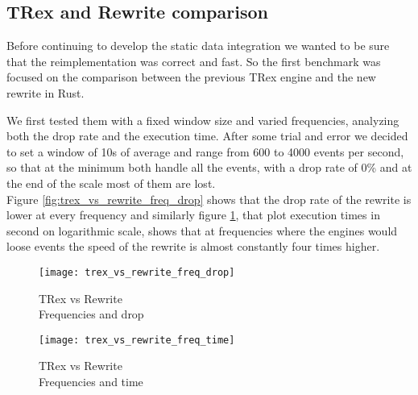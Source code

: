 \subsection{TRex and Rewrite comparison}
Before continuing to develop the static data integration we wanted to be sure that the reimplementation was correct and fast. So the first benchmark was focused on the comparison between the previous TRex engine and the new rewrite in Rust.

We first tested them with a fixed window size and varied frequencies, analyzing both the drop rate and the execution time. After some trial and error we decided to set a window of 10s of average and range from 600 to 4000 events per second, so that at the minimum both handle all the events, with a drop rate of 0\% and at the end of the scale most of them are lost.\\
Figure \ref{fig:trex_vs_rewrite_freq_drop} shows that the drop rate of the rewrite is lower at every frequency and similarly figure \ref{fig:trex_vs_rewrite_freq_time}, that plot execution times in second on logarithmic scale, shows that at frequencies where the engines would loose events the speed of the rewrite is almost constantly four times higher.
\begin{figure}[h]
\captionsetup{justification=centering}
\begin{minipage}{.5\textwidth}
  \centering
  \texttt{[image: trex\_vs\_rewrite\_freq\_drop]}
  \caption{TRex vs Rewrite\\
  	Frequencies and drop}
  \label{fig:trex_vs_rewrite_freq_drop}
\end{minipage}%
\begin{minipage}{.5\textwidth}
  \centering
  \texttt{[image: trex\_vs\_rewrite\_freq\_time]}
  \caption{TRex vs Rewrite\\
  	Frequencies and time}
  \label{fig:trex_vs_rewrite_freq_time}
\end{minipage}
\end{figure}


